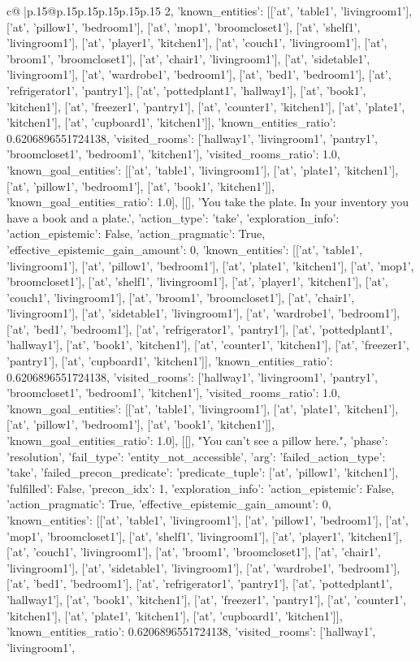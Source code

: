\documentclass{article}
\begin{document}
{\begin{supertabular}{c@{$\;$}|p{.15\linewidth}@{}p{.15\linewidth}p{.15\linewidth}p{.15\linewidth}p{.15\linewidth}p{.15\linewidth}}
{{{2, 'known_entities': [['at', 'table1', 'livingroom1'], ['at', 'pillow1', 'bedroom1'], ['at', 'mop1', 'broomcloset1'], ['at', 'shelf1', 'livingroom1'], ['at', 'player1', 'kitchen1'], ['at', 'couch1', 'livingroom1'], ['at', 'broom1', 'broomcloset1'], ['at', 'chair1', 'livingroom1'], ['at', 'sidetable1', 'livingroom1'], ['at', 'wardrobe1', 'bedroom1'], ['at', 'bed1', 'bedroom1'], ['at', 'refrigerator1', 'pantry1'], ['at', 'pottedplant1', 'hallway1'], ['at', 'book1', 'kitchen1'], ['at', 'freezer1', 'pantry1'], ['at', 'counter1', 'kitchen1'], ['at', 'plate1', 'kitchen1'], ['at', 'cupboard1', 'kitchen1']], 'known_entities_ratio': 0.6206896551724138, 'visited_rooms': ['hallway1', 'livingroom1', 'pantry1', 'broomcloset1', 'bedroom1', 'kitchen1'], 'visited_rooms_ratio': 1.0, 'known_goal_entities': [['at', 'table1', 'livingroom1'], ['at', 'plate1', 'kitchen1'], ['at', 'pillow1', 'bedroom1'], ['at', 'book1', 'kitchen1']], 'known_goal_entities_ratio': 1.0}}], [[], 'You take the plate. In your inventory you have a book and a plate.', {'action_type': 'take', 'exploration_info': {'action_epistemic': False, 'action_pragmatic': True, 'effective_epistemic_gain_amount': 0, 'known_entities': [['at', 'table1', 'livingroom1'], ['at', 'pillow1', 'bedroom1'], ['at', 'plate1', 'kitchen1'], ['at', 'mop1', 'broomcloset1'], ['at', 'shelf1', 'livingroom1'], ['at', 'player1', 'kitchen1'], ['at', 'couch1', 'livingroom1'], ['at', 'broom1', 'broomcloset1'], ['at', 'chair1', 'livingroom1'], ['at', 'sidetable1', 'livingroom1'], ['at', 'wardrobe1', 'bedroom1'], ['at', 'bed1', 'bedroom1'], ['at', 'refrigerator1', 'pantry1'], ['at', 'pottedplant1', 'hallway1'], ['at', 'book1', 'kitchen1'], ['at', 'counter1', 'kitchen1'], ['at', 'freezer1', 'pantry1'], ['at', 'cupboard1', 'kitchen1']], 'known_entities_ratio': 0.6206896551724138, 'visited_rooms': ['hallway1', 'livingroom1', 'pantry1', 'broomcloset1', 'bedroom1', 'kitchen1'], 'visited_rooms_ratio': 1.0, 'known_goal_entities': [['at', 'table1', 'livingroom1'], ['at', 'plate1', 'kitchen1'], ['at', 'pillow1', 'bedroom1'], ['at', 'book1', 'kitchen1']], 'known_goal_entities_ratio': 1.0}}], [[], "You can't see a pillow here.", {'phase': 'resolution', 'fail_type': 'entity_not_accessible', 'arg': {'failed_action_type': 'take', 'failed_precon_predicate': {'predicate_tuple': ['at', 'pillow1', 'kitchen1'], 'fulfilled': False, 'precon_idx': 1}}, 'exploration_info': {'action_epistemic': False, 'action_pragmatic': True, 'effective_epistemic_gain_amount': 0, 'known_entities': [['at', 'table1', 'livingroom1'], ['at', 'pillow1', 'bedroom1'], ['at', 'mop1', 'broomcloset1'], ['at', 'shelf1', 'livingroom1'], ['at', 'player1', 'kitchen1'], ['at', 'couch1', 'livingroom1'], ['at', 'broom1', 'broomcloset1'], ['at', 'chair1', 'livingroom1'], ['at', 'sidetable1', 'livingroom1'], ['at', 'wardrobe1', 'bedroom1'], ['at', 'bed1', 'bedroom1'], ['at', 'refrigerator1', 'pantry1'], ['at', 'pottedplant1', 'hallway1'], ['at', 'book1', 'kitchen1'], ['at', 'freezer1', 'pantry1'], ['at', 'counter1', 'kitchen1'], ['at', 'plate1', 'kitchen1'], ['at', 'cupboard1', 'kitchen1']], 'known_entities_ratio': 0.6206896551724138, 'visited_rooms': ['hallway1', 'livingroom1', }}}
\end{supertabular}}
\end{document}

